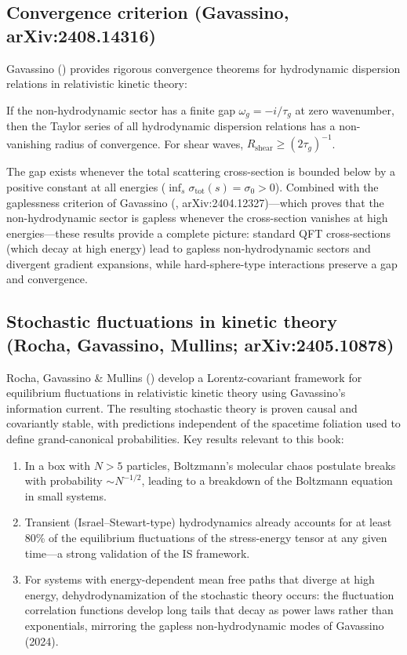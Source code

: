 \subsection{Convergence criterion (Gavassino, arXiv:2408.14316)}

Gavassino (\citealt{GavassinoConvergence2024}) provides rigorous
convergence theorems for hydrodynamic dispersion relations in relativistic
kinetic theory:

\begin{theorem}[Gavassino 2024]
If the non-hydrodynamic sector has a finite gap $\omega_g = -i/\tau_g$
at zero wavenumber, then the Taylor series of all hydrodynamic dispersion
relations has a non-vanishing radius of convergence.  For shear waves,
$R_{\mathrm{shear}} \geq (2\tau_g)^{-1}$.
\end{theorem}

The gap exists whenever the total scattering cross-section is bounded
below by a positive constant at all energies ($\inf_s \sigma_{\mathrm{tot}}
(s) = \sigma_0 > 0$).  Combined with the gaplessness criterion of
Gavassino (\citealt{GavassinoGapless2024}, arXiv:2404.12327)---which
proves that the non-hydrodynamic sector is gapless whenever the
cross-section vanishes at high energies---these results provide a
complete picture: standard QFT cross-sections (which decay at high
energy) lead to gapless non-hydrodynamic sectors and divergent gradient
expansions, while hard-sphere-type interactions preserve a gap and
convergence.

\subsection{Stochastic fluctuations in kinetic theory (Rocha, Gavassino,
  Mullins; arXiv:2405.10878)}

Rocha, Gavassino \& Mullins (\citealt{RochaGavassinoFluctu2024})
develop a Lorentz-covariant framework for equilibrium fluctuations in
relativistic kinetic theory using Gavassino's information current.  The
resulting stochastic theory is proven causal and covariantly stable,
with predictions independent of the spacetime foliation used to define
grand-canonical probabilities.  Key results relevant to this book:
\begin{enumerate}
\item In a box with $N > 5$ particles, Boltzmann's molecular chaos
  postulate breaks with probability $\sim N^{-1/2}$, leading to a
  breakdown of the Boltzmann equation in small systems.
\item Transient (Israel--Stewart-type) hydrodynamics already accounts
  for at least 80\% of the equilibrium fluctuations of the stress-energy
  tensor at any given time---a strong validation of the IS framework.
\item For systems with energy-dependent mean free paths that diverge at
  high energy, dehydrodynamization of the stochastic theory occurs: the
  fluctuation correlation functions develop long tails that decay as
  power laws rather than exponentials, mirroring the gapless
  non-hydrodynamic modes of Gavassino (2024).
\end{enumerate}

